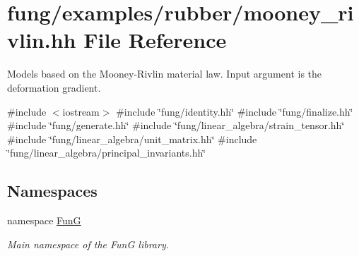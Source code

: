 \hypertarget{mooney__rivlin_8hh}{\section{fung/examples/rubber/mooney\-\_\-rivlin.hh \-File \-Reference}
\label{mooney__rivlin_8hh}
}


\-Models based on the \-Mooney-\/\-Rivlin material law. \-Input argument is the deformation gradient.  


{\ttfamily \#include $<$iostream$>$}\*
{\ttfamily \#include \char`\"{}fung/identity.\-hh\char`\"{}}\*
{\ttfamily \#include \char`\"{}fung/finalize.\-hh\char`\"{}}\*
{\ttfamily \#include \char`\"{}fung/generate.\-hh\char`\"{}}\*
{\ttfamily \#include \char`\"{}fung/linear\-\_\-algebra/strain\-\_\-tensor.\-hh\char`\"{}}\*
{\ttfamily \#include \char`\"{}fung/linear\-\_\-algebra/unit\-\_\-matrix.\-hh\char`\"{}}\*
{\ttfamily \#include \char`\"{}fung/linear\-\_\-algebra/principal\-\_\-invariants.\-hh\char`\"{}}\*
\subsection*{\-Namespaces}
\begin{DoxyCompactItemize}
\item 
namespace \hyperlink{namespaceFunG}{\-Fun\-G}
\begin{DoxyCompactList}\small\item\em \-Main namespace of the \-Fun\-G library. \end{DoxyCompactList}\end{DoxyCompactItemize}
